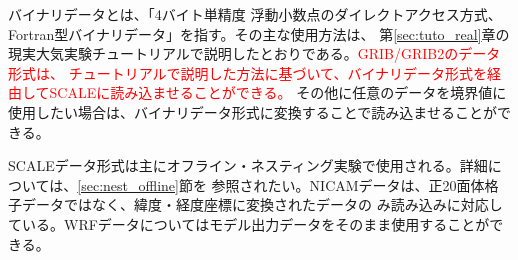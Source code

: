 バイナリデータとは、「4バイト単精度
浮動小数点のダイレクトアクセス方式、Fortran型バイナリデータ」を指す。その主な使用方法は、
第\ref{sec:tuto_real}章の現実大気実験チュートリアルで説明したとおりである。\textcolor{red}{GRIB/GRIB2のデータ形式は、
チュートリアルで説明した方法に基づいて、バイナリデータ形式を経由してSCALEに読み込ませることができる。}
その他に任意のデータを境界値に使用したい場合は、バイナリデータ形式に変換することで読み込ませることができる。

SCALEデータ形式は主にオフライン・ネスティング実験で使用される。詳細については、\ref{sec:nest_offline}節を
参照されたい。NICAMデータは、正20面体格子データではなく、緯度・経度座標に変換されたデータの
み読み込みに対応している。WRFデータについてはモデル出力データをそのまま使用することができる。

